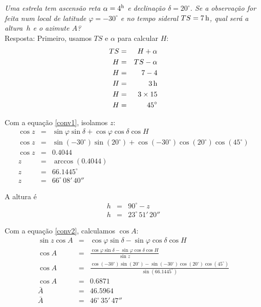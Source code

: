 \begin{exemplo}{9}
\textit{Uma estrela tem ascensão reta $\alpha = 4^{\rm h}$ e declinação $\delta = 20^{\circ}$. Se a observação for feita num local de latitude $\varphi = -30^{\circ}$ e no tempo sideral $TS = 7\,{\rm h}$, qual será a altura~$h$ e o azimute $A$?}\\

Resposta: Primeiro, usamos $TS$ e $\alpha$ para calcular $H$:
%
\begin{eqnarray*}
TS &=& H + \alpha \\
H &=& TS - \alpha \\
H &=& 7 - 4 \\
H &=& 3\,{\rm h} \\
H &=& 3 \times 15 \\
H &=& 45^{\circ} \\
\end{eqnarray*}

Com a equação \ref{conv1}, isolamos $z$:
%
\begin{eqnarray*}
\cos z &=& \sin \varphi  \sin \delta  + \cos \varphi  \cos \delta  \cos H \\
\cos z &=& \sin(-30^{\circ})  \sin(20^{\circ})  + \cos(-30^{\circ})  \cos(20^{\circ})  \cos(45^{\circ}) \\
\cos z &=& 0.4044 \\
z &=& \arccos(0.4044) \\
z &=& 66.1445^{\circ} \\
z &=& 66^{\circ}\,08'\,40''
\end{eqnarray*}


A altura é
\begin{eqnarray*}
h &=& 90^{\circ} - z \\
h &=& 23^{\circ}\,51'\,20''
\end{eqnarray*}

Com a equação \ref{conv2}, calculamos $\cos A$:
%
\begin{eqnarray*}
\sin z \cos A &=& \cos \varphi \sin \delta - \sin \varphi \cos \delta \cos H \\
\cos A &=& \frac{\cos \varphi \sin \delta - \sin \varphi \cos \delta \cos H}{\sin z} \\
\cos A &=& \frac{\cos(-30^{\circ}) \sin(20^{\circ}) - \sin(-30^{\circ}) \cos(20^{\circ}) \cos(45^{\circ})}{\sin(66.1445^{\circ})} \\
\cos A &=&  0.6871 \\
\bar{A} &=& 46.5964 \\
\bar{A} &=& 46^{\circ}\,35'\,47''
\end{eqnarray*}


\end{exemplo}
